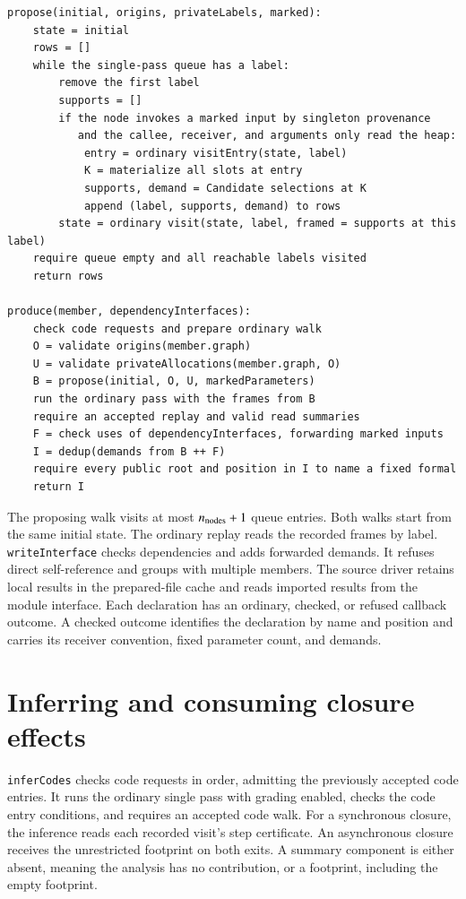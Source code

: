 \documentclass[10pt,a4paper]{article}
\theoremstyle{definition}
\newcommand{\lean}[1]{\textcolor{leanc}{\texttt{\small #1}}}
\begin{document}
\begin{lstlisting}[language=Pseudocode]
propose(initial, origins, privateLabels, marked):
    state = initial
    rows = []
    while the single-pass queue has a label:
        remove the first label
        supports = []
        if the node invokes a marked input by singleton provenance
           and the callee, receiver, and arguments only read the heap:
            entry = ordinary visitEntry(state, label)
            K = materialize all slots at entry
            supports, demand = Candidate selections at K
            append (label, supports, demand) to rows
        state = ordinary visit(state, label, framed = supports at this label)
    require queue empty and all reachable labels visited
    return rows

produce(member, dependencyInterfaces):
    check code requests and prepare ordinary walk
    O = validate origins(member.graph)
    U = validate privateAllocations(member.graph, O)
    B = propose(initial, O, U, markedParameters)
    run the ordinary pass with the frames from B
    require an accepted replay and valid read summaries
    F = check uses of dependencyInterfaces, forwarding marked inputs
    I = dedup(demands from B ++ F)
    require every public root and position in I to name a fixed formal
    return I
\end{lstlisting}

The proposing walk visits at most $n_{\rm nodes}+1$ queue entries.
Both walks start from the same initial state. The ordinary replay reads
the recorded frames by label. \lean{writeInterface} checks dependencies
and adds forwarded demands. It refuses direct self-reference and groups
with multiple members. The source driver retains local results in the
prepared-file cache and reads imported results from the module
interface. Each declaration has an ordinary, checked, or refused
callback outcome. A checked outcome identifies the declaration by name
and position and carries its receiver convention, fixed parameter
count, and demands.

\section{Inferring and consuming closure effects}\label{sec:effects}

\lean{inferCodes} checks code requests in order, admitting the
previously accepted code entries. It runs the ordinary single pass
with grading enabled, checks the code entry conditions, and requires
an accepted code walk. For a synchronous closure, the inference
reads each recorded visit's step certificate. An asynchronous
closure receives the unrestricted footprint on both exits. A
summary component is either absent, meaning the analysis has no
contribution, or a footprint, including the empty footprint.
\end{document}
